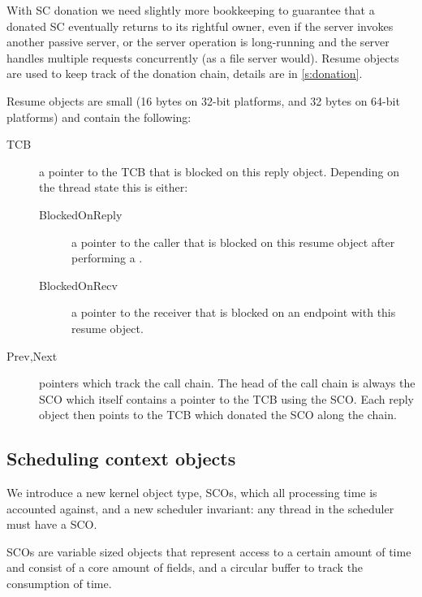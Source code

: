 With \gls{SC} donation we need slightly more bookkeeping to guarantee that a
donated SC eventually returns to its rightful owner, even if the
server invokes another passive server, or the server operation is
long-running and the server handles multiple requests concurrently (as
a file server would). Resume objects are used to keep track of the donation chain, details are in \autoref{s:donation}.

Resume objects are small (16 bytes on 32-bit platforms, and 32 bytes on 64-bit platforms) and
contain the following:

\begin{description}
    \item[TCB] a pointer to the \gls{TCB} that is blocked on this reply object. Depending on the
        thread state this is either: 
        \begin{description}
            \item [BlockedOnReply] a pointer to the caller that is blocked on this resume object
                after performing a \call. 
            \item [BlockedOnRecv] a pointer to the receiver that is blocked on an endpoint with this
                resume object.
        \end{description}
    \item[Prev,Next] pointers which track the call chain. The head of the call chain is always the
        \gls{SCO} which itself contains a pointer to the \gls{TCB} using the \gls{SCO}. Each reply
        object then points to the \gls{TCB} which donated the \gls{SCO} along the chain.
\end{description}


\subsection{Scheduling context objects}
\label{s:sco}

We introduce a new kernel object type, \glspl{SCO}, which all processing time is accounted against, 
and a new scheduler invariant: any thread in the scheduler must have a \gls{SCO}. 



\glspl{SCO} are variable sized objects that represent access to a certain amount of time and
consist of a core amount of fields, and a circular buffer to track the consumption of time.



